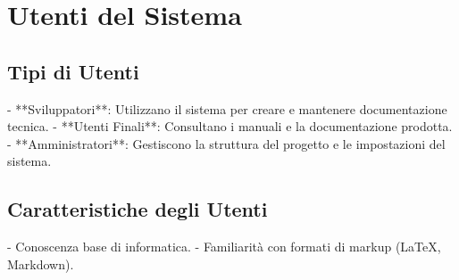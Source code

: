 \section{Utenti del Sistema}

\subsection{Tipi di Utenti}

- **Sviluppatori**: Utilizzano il sistema per creare e mantenere documentazione tecnica.
- **Utenti Finali**: Consultano i manuali e la documentazione prodotta.
- **Amministratori**: Gestiscono la struttura del progetto e le impostazioni del sistema.

\subsection{Caratteristiche degli Utenti}

- Conoscenza base di informatica.
- Familiarità con formati di markup (LaTeX, Markdown).